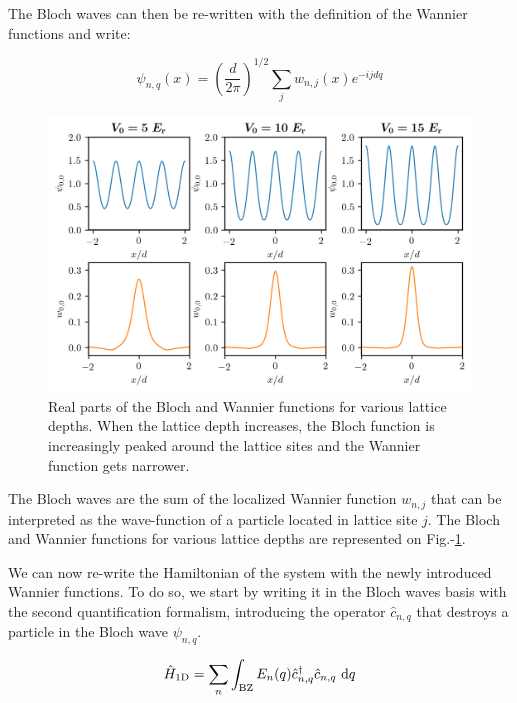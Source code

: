 The Bloch waves can then be re-written with the definition of the Wannier functions and write:

\begin{equation}
    \psi_{n, q}(x)=\left(\frac{d}{2 \pi}\right)^{1 / 2} \sum_{j} w_{n, j}(x) e^{-i j d q}
    \label{eq:bloch_as_wannier}
\end{equation}


\begin{figure}
    \centering
    \includegraphics[width=\textwidth]{Fig/Chapter2/bloch_wannier.png}
    \caption{Real parts of the Bloch and Wannier functions for various lattice depths. When the lattice depth increases, the Bloch function is increasingly peaked around the lattice sites and the Wannier function gets narrower.}
    \label{fig:bloch_wannier}
\end{figure}

\noindent The Bloch waves are the sum of the localized Wannier function $w_{n, j}$ that can be interpreted as the wave-function of a particle located in lattice site $j$. The Bloch and Wannier functions for various lattice depths are represented on Fig.-\ref{fig:bloch_wannier}.

We can now re-write the Hamiltonian of the system with the newly introduced Wannier functions. To do so, we start by writing it in the Bloch waves basis with the second quantification formalism, introducing the operator $\hat{c}_{n,q}$ that destroys a particle in the Bloch wave $\psi_{n,q}$.

\begin{equation}
    \hat{H}_{\rm{1D}}=\sum_{n} \int_{\mathrm{BZ}} E_{n}(q) \hat{c}_{n, q}^{\dagger} \hat{c}_{n, q} \mathrm{~d} q
    \label{eq:H_bloch}
\end{equation}

